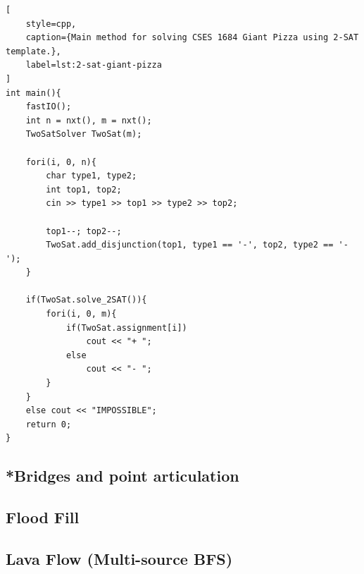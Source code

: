 \documentclass[letterpaper,landscape]{article}
\begin{document}
\begin{lstlisting}[
    style=cpp,
    caption={Main method for solving CSES 1684 Giant Pizza using 2-SAT template.},
    label=lst:2-sat-giant-pizza
]
int main(){
    fastIO();
    int n = nxt(), m = nxt();
    TwoSatSolver TwoSat(m);

    fori(i, 0, n){
        char type1, type2;
        int top1, top2;
        cin >> type1 >> top1 >> type2 >> top2;

        top1--; top2--;
        TwoSat.add_disjunction(top1, type1 == '-', top2, type2 == '-');
    }

    if(TwoSat.solve_2SAT()){
        fori(i, 0, m){
            if(TwoSat.assignment[i])
                cout << "+ ";
            else 
                cout << "- "; 
        }
    }
    else cout << "IMPOSSIBLE";
    return 0;
}
\end{lstlisting}

\subsection{*Bridges and point articulation}

\subsection{Flood Fill}



\subsection{Lava Flow (Multi-source BFS)}


\end{document}
